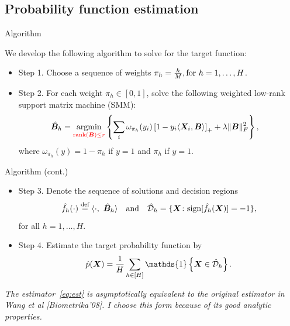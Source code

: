 \documentclass[compress,dvipsnames]{beamer}
\let\olditem\item
\renewcommand\item{\olditem\justifying}
\begin{document}
\subsection{Probability function estimation}
\begin{frame}{Algorithm}

We develop the following algorithm to solve for the target function: 
\begin{itemize}
\item Step 1. Choose a sequence of weights $\pi_h = {h\over M}, \text{for }h=1,\ldots,H$.
\item Step 2. For each weight $\pi_h\in[0,1]$, solve the following {\color{red}weighted low-rank support matrix machine (SMM)}:
\begin{align}\label{eq:sequence}
\hat {\bm{B}}_h&=\operatorname*{argmin}_{{\color{red}\text{rank}(\bm{B})\leq r}} \left\{\sum_{i}\omega_{\pi_h}(y_i)\left[1-y_i\langle \bm{X}_i,\bm{B} \rangle\right]_++\lambda\lVert\bm{B}\rVert_F^2\right\},
\end{align}
\vspace{-2cm}
where $\omega_{\pi_h}(y) = 1-\pi_h$ if $y = 1$ and $\pi_h$ if $y =1$.
\end{itemize}
\end{frame}

\begin{frame}{Algorithm (cont.)}
\begin{itemize}
\item Step 3. Denote the sequence of solutions and decision regions
\[
\hat f_h (\cdot)\stackrel{\text{def}}{=}\langle \cdot,\ \hat {\bm{B}}_h \rangle \quad \text{and}\quad \hat {{\mathcal D}}_h=\{\bm{X}\colon\text{sign}[\hat f_h(\bm{X})] = -1 \},
\]
for all $h=1,\ldots,H$.
\item Step 4. Estimate the target probability function by
\begin{align}\label{eq:est}
\hat p(\mX)={1\over H} \sum_{h\in[H]} \mathds{1}\left\{\mX\in \hat \tD_h \right\}.
\end{align}

\end{itemize}
{\scriptsize \it The estimator~\eqref{eq:est} is asymptotically equivalent to the original estimator in Wang et al [Biometrika'08]. I choose this form because of its good analytic properties.}

\end{frame}
\end{document}
